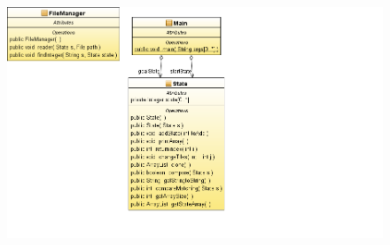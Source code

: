 \documentclass[10pt,a4paper]{report}
\begin{document}
\thispagestyle{empty}
\begin{figure}
\centering
\includegraphics[width=1.4\textwidth,natwidth=610,natheight=642]{../Model/CSM6120_Assignment2-Model/ClassDiagram1.png} 

\end{figure}
\end{document}

